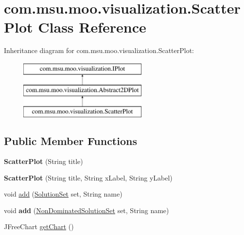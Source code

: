 \hypertarget{classcom_1_1msu_1_1moo_1_1visualization_1_1ScatterPlot}{\section{com.\-msu.\-moo.\-visualization.\-Scatter\-Plot Class Reference}
\label{classcom_1_1msu_1_1moo_1_1visualization_1_1ScatterPlot}
}
Inheritance diagram for com.\-msu.\-moo.\-visualization.\-Scatter\-Plot\-:\begin{figure}[H]
\begin{center}
\leavevmode
\includegraphics[height=3.000000cm]{classcom_1_1msu_1_1moo_1_1visualization_1_1ScatterPlot}
\end{center}
\end{figure}
\subsection*{Public Member Functions}
\begin{DoxyCompactItemize}
\item 
\hypertarget{classcom_1_1msu_1_1moo_1_1visualization_1_1ScatterPlot_ae1641035e865ac60aa17ec5be881fdf6}{{\bfseries Scatter\-Plot} (String title)}\label{classcom_1_1msu_1_1moo_1_1visualization_1_1ScatterPlot_ae1641035e865ac60aa17ec5be881fdf6}

\item 
\hypertarget{classcom_1_1msu_1_1moo_1_1visualization_1_1ScatterPlot_ad4155b5893e37944768a35b90ede23e4}{{\bfseries Scatter\-Plot} (String title, String x\-Label, String y\-Label)}\label{classcom_1_1msu_1_1moo_1_1visualization_1_1ScatterPlot_ad4155b5893e37944768a35b90ede23e4}

\item 
void \hyperlink{classcom_1_1msu_1_1moo_1_1visualization_1_1ScatterPlot_abf7740669f9017367f5ac05899179854}{add} (\hyperlink{classcom_1_1msu_1_1moo_1_1model_1_1solution_1_1SolutionSet}{Solution\-Set} set, String name)
\item 
\hypertarget{classcom_1_1msu_1_1moo_1_1visualization_1_1ScatterPlot_a00d6f928daa34c96950eb780c8bff4b8}{void {\bfseries add} (\hyperlink{classcom_1_1msu_1_1moo_1_1model_1_1solution_1_1NonDominatedSolutionSet}{Non\-Dominated\-Solution\-Set} set, String name)}\label{classcom_1_1msu_1_1moo_1_1visualization_1_1ScatterPlot_a00d6f928daa34c96950eb780c8bff4b8}

\item 
J\-Free\-Chart \hyperlink{classcom_1_1msu_1_1moo_1_1visualization_1_1ScatterPlot_a1c5117bd94b91e9ae2f59c1c025b243b}{get\-Chart} ()
\end{DoxyCompactItemize}
